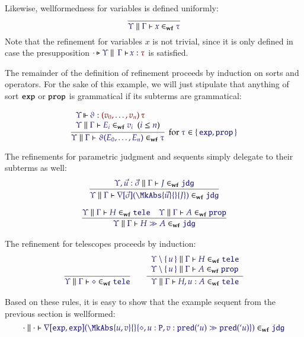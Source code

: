 Likewise, wellformedness for variables is defined uniformly:
\[
  \infer{
    \IsWf{\Upsilon}{\Gamma}{x}{\tau}
  }{
  }
\]
Note that the refinement for variables $x$ is not trivial, since it is only
defined in case the presupposition $\IsAbt{\cdot}{\Upsilon}{\Gamma}{x}{\tau}$
is satisfied.

The remainder of the definition of refinement proceeds by induction on sorts and
operators. For the sake of this example, we will just stipulate that anything of
sort $\mathtt{exp}$ or $\mathtt{prop}$ is grammatical if its subterms are grammatical:

\[
  \infer[
    \text{for $\Member{\tau}{\MkSet{\SortExp,\SortProp}}$}
  ]{
    \IsWf{\Upsilon}{\Gamma}{
      \App{\vartheta}{E_0,\dots,E_n}
    }{\tau}
  }{
    \begin{array}{l}
      \IsOperator{\Upsilon}{\vartheta}{
        \MkArity{
          v_0,\dots,v_n
        }{\tau}
      }
\\
      \HypJ{
        \IsWf{\Upsilon}{\Gamma}{E_i}{v_i}
      }{
        \Leq{i}{n}
      }
    \end{array}
  }
\]

The refinements for parametric judgment and sequents simply delegate to their
subterms as well:
\begin{gather*}
  \infer{
    \IsWf{\Upsilon}{\Gamma}{
      \App{\OpNabla{\vec{\sigma}}}{
        \MkAbs{\vec{u}}{}{J}
      }
    }{\SortJdg}
  }{
    \IsWf{\Upsilon,\vec{u}:\vec{\sigma}}{\Gamma}{J}{\SortJdg}
  }
\\[6pt]
  \infer{
    \IsWf{\Upsilon}{\Gamma}{
      H\gg A
    }{\SortJdg}
  }{
    \IsWf{\Upsilon}{\Gamma}{H}{\SortTele}
&
    \IsWf{\Upsilon}{\Gamma}{A}{\SortProp}
  }
\end{gather*}

The refinement for telescopes proceeds by induction:
\begin{gather*}
  \infer{
    \IsWf{\Upsilon}{\Gamma}{\diamond}{\SortTele}
  }{
  }
\qquad
  \infer{
    \IsWf{\Upsilon}{\Gamma}{H,u:A}{\SortTele}
  }{
    \begin{array}{l}
      \IsWf{\Upsilon\setminus\MkSet{u}}{\Gamma}{H}{\SortTele}
\\
      \IsWf{\Upsilon\setminus\MkSet{u}}{\Gamma}{A}{\SortProp}
    \end{array}
  }
\end{gather*}

Based on these rules, it is easy to show that the example sequent from the
previous section is wellformed:
\[
  \IsWf{\cdot}{\cdot}{
    \App{\OpNabla{\SortExp,\SortExp}}{
      \MkAbs{u,v}{}{
        \diamond,u:\mathtt{P},v:\App{\mathtt{pred}}{`u}
        \gg
        \App{\mathtt{pred}}{`u}
      }
    }
  }{\SortJdg}
\]

